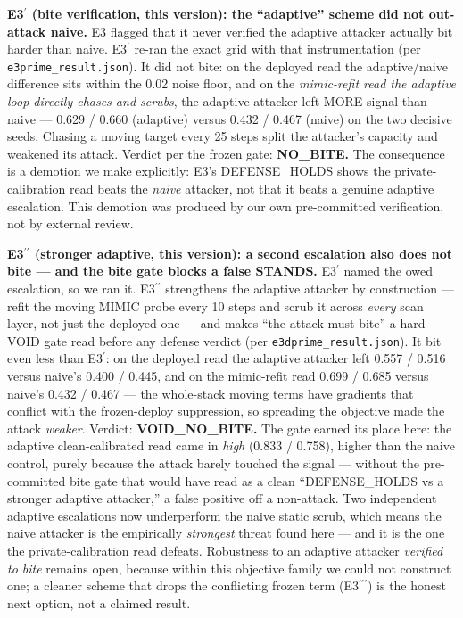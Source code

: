 \documentclass[
  11pt,
]{article}
\begin{document}
\textbf{E3$^\prime$ (bite verification, this version): the ``adaptive'' scheme
did not out-attack naive.} E3 flagged that it never verified the
adaptive attacker actually bit harder than naive. E3$^\prime$ re-ran the exact
grid with that instrumentation (per \texttt{e3prime\_result.json}). It
did not bite: on the deployed read the adaptive/naive difference sits
within the 0.02 noise floor, and on the \emph{mimic-refit read the
adaptive loop directly chases and scrubs}, the adaptive attacker left
MORE signal than naive --- 0.629 / 0.660 (adaptive) versus 0.432 / 0.467
(naive) on the two decisive seeds. Chasing a moving target every 25
steps split the attacker's capacity and weakened its attack. Verdict per
the frozen gate: \textbf{NO\_BITE.} The consequence is a demotion we
make explicitly: E3's DEFENSE\_HOLDS shows the private-calibration read
beats the \emph{naive} attacker, not that it beats a genuine adaptive
escalation. This demotion was produced by our own pre-committed
verification, not by external review.

\textbf{E3$^{\prime\prime}$ (stronger adaptive, this version): a second escalation also
does not bite --- and the bite gate blocks a false STANDS.} E3$^\prime$ named
the owed escalation, so we ran it. E3$^{\prime\prime}$ strengthens the adaptive attacker
by construction --- refit the moving MIMIC probe every 10 steps and
scrub it across \emph{every} scan layer, not just the deployed one ---
and makes ``the attack must bite'' a hard VOID gate read before any
defense verdict (per \texttt{e3dprime\_result.json}). It bit even less
than E3$^\prime$: on the deployed read the adaptive attacker left 0.557 / 0.516
versus naive's 0.400 / 0.445, and on the mimic-refit read 0.699 / 0.685
versus naive's 0.432 / 0.467 --- the whole-stack moving terms have
gradients that conflict with the frozen-deploy suppression, so spreading
the objective made the attack \emph{weaker}. Verdict:
\textbf{VOID\_NO\_BITE.} The gate earned its place here: the adaptive
clean-calibrated read came in \emph{high} (0.833 / 0.758), higher than
the naive control, purely because the attack barely touched the signal
--- without the pre-committed bite gate that would have read as a clean
``DEFENSE\_HOLDS vs a stronger adaptive attacker,'' a false positive off
a non-attack. Two independent adaptive escalations now underperform the
naive static scrub, which means the naive attacker is the empirically
\emph{strongest} threat found here --- and it is the one the
private-calibration read defeats. Robustness to an adaptive attacker
\emph{verified to bite} remains open, because within this objective
family we could not construct one; a cleaner scheme that drops the
conflicting frozen term (E3$^{\prime\prime\prime}$) is the honest next option, not a claimed
result.
\end{document}
